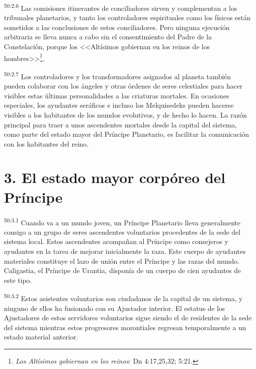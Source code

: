 \par
\textsuperscript{50:2.6} Las comisiones itinerantes de conciliadores sirven y complementan a los tribunales planetarios, y tanto los controladores espirituales como los físicos están sometidos a las conclusiones de estos conciliadores. Pero ninguna ejecución arbitraria se lleva nunca a cabo sin el consentimiento del Padre de la Constelación, porque los <<Altísimos gobiernan en los reinos de los hombres>>\footnote{\textit{Los Altísimos gobiernan en los reinos}: Dn 4:17,25,32; 5:21.}.

\par
\textsuperscript{50:2.7} Los controladores y los transformadores asignados al planeta también pueden colaborar con los ángeles y otras órdenes de seres celestiales para hacer visibles estas últimas personalidades a las criaturas mortales. En ocasiones especiales, los ayudantes seráficos e incluso los Melquisedeks pueden hacerse visibles a los habitantes de los mundos evolutivos, y de hecho lo hacen. La razón principal para traer a unos ascendentes mortales desde la capital del sistema, como parte del estado mayor del Príncipe Planetario, es facilitar la comunicación con los habitantes del reino.

\section*{3. El estado mayor corpóreo del Príncipe}
\par
\textsuperscript{50:3.1} Cuando va a un mundo joven, un Príncipe Planetario lleva generalmente consigo a un grupo de seres ascendentes voluntarios procedentes de la sede del sistema local. Estos ascendentes acompañan al Príncipe como consejeros y ayudantes en la tarea de mejorar inicialmente la raza. Este cuerpo de ayudantes materiales constituye el lazo de unión entre el Príncipe y las razas del mundo. Caligastia, el Príncipe de Urantia, disponía de un cuerpo de cien ayudantes de este tipo.

\par
\textsuperscript{50:3.2} Estos asistentes voluntarios son ciudadanos de la capital de un sistema, y ninguno de ellos ha fusionado con su Ajustador interior. El estatus de los Ajustadores de estos servidores voluntarios sigue siendo el de residentes de la sede del sistema mientras estos progresores morontiales regresan temporalmente a un estado material anterior.


